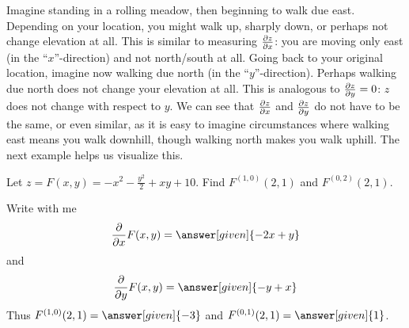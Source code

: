 \documentclass{ximera}
\begin{document}
Imagine standing in a rolling meadow, then beginning to walk due
east. Depending on your location, you might walk up, sharply down, or
perhaps not change elevation at all. This is similar to measuring
$\pp[z]{x}$: you are moving only east (in the ``$x$''-direction) and
not north/south at all. Going back to your original location, imagine
now walking due north (in the ``$y$''-direction). Perhaps walking due
north does not change your elevation at all. This is analogous to
$\pp[z]{y}=0$: $z$ does not change with respect to $y$. We can see
that $\pp[z]{x}$ and $\pp[z]{y}$ do not have to be the same, or even
similar, as it is easy to imagine circumstances where walking east
means you walk downhill, though walking north makes you walk uphill.
The next example helps us visualize this.


\begin{example}
  Let $z=F(x,y)=-x^2-\frac{y^2}{2}+xy+10$. Find $F^{(1,0)}(2,1)$ and
  $F^{(0,2)}(2,1)$.
  \begin{explanation}
    Write with me
    \[
    \pp{x}F(x,y) = \answer[given]{-2x+y}
    \]
    and
    \[
    \pp{y}F(x,y) = \answer[given]{-y+x}
    \]
    Thus $F^{(1,0)}(2,1) = \answer[given]{-3}$ and $F^{(0,1)}(2,1) =
    \answer[given]{1}$.
  \end{explanation}
\end{example}
\end{document}
